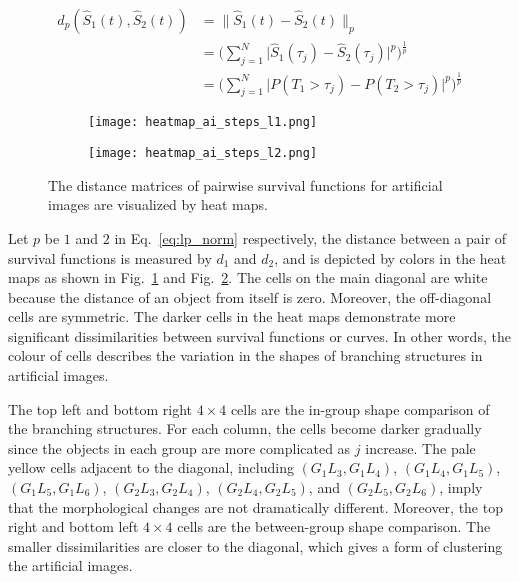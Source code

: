       \begin{equation}\label{eq:lp_norm}
        \begin{split}
          d_p(\widehat S_1(t), \widehat S_2(t))&= \lVert \widehat S_1(t) - \widehat S_2(t) \rVert_{p} \\
          &= \Big(\sum^{N}_{j=1} \lvert \widehat S_1(\tau_j) - \widehat S_2(\tau_j)\rvert^p\Big)^{\frac{1}{p}} \\
          &= \Big(\sum^{N}_{j=1} \lvert P({T_1 > \tau_j}) - P({T_2 > \tau_j}) \rvert^p\Big)^{\frac{1}{p}}
        \end{split}
      \end{equation}
      
      
      \begin{figure}
        \centering
        \begin{subfigure}[b]{0.45\textwidth}
          \texttt{[image: heatmap\_ai\_steps\_l1.png]}
          \caption{}
          \label{fig:heatmap_ai_steps_l1}
        \end{subfigure}
        \begin{subfigure}[b]{0.45\textwidth}
          \texttt{[image: heatmap\_ai\_steps\_l2.png]}
          \caption{}
          \label{fig:heatmap_ai_steps_l2}
        \end{subfigure}
        \caption{The distance matrices of pairwise survival functions for artificial images are visualized by heat maps.}
        \label{fig:heatmap_ai_steps}
      \end{figure}


      Let $p$ be $1$ and $2$ in Eq.~\ref{eq:lp_norm} respectively, the
      distance between a pair of survival functions is measured by
      $d_1$ and $d_2$, and is depicted by colors in the heat maps as
      shown in Fig.~\ref{fig:heatmap_ai_steps_l1} and
      Fig.~\ref{fig:heatmap_ai_steps_l2}. The cells on the main
      diagonal are white because the distance of an object from itself
      is zero. Moreover, the off-diagonal cells are symmetric. The
      darker cells in the heat maps demonstrate more significant
      dissimilarities between survival functions or curves. In other
      words, the colour of cells describes the variation in the shapes
      of branching structures in artificial images.


      The top left and bottom right $4 \times 4$ cells are the
      in-group shape comparison of the branching structures. For each
      column, the cells become darker gradually since the objects in
      each group are more complicated as $j$ increase. The pale yellow
      cells adjacent to the diagonal, including $(G_1L_3, G_1L_4)$,
      $(G_1L_4, G_1L_5)$, $(G_1L_5, G_1L_6)$, $(G_2L_3, G_2L_4)$,
      $(G_2L_4, G_2L_5)$, and $(G_2L_5, G_2L_6)$, imply that the
      morphological changes are not dramatically different. Moreover,
      the top right and bottom left $4 \times 4$ cells are the
      between-group shape comparison. The smaller dissimilarities are
      closer to the diagonal, which gives a form of clustering the
      artificial images.

